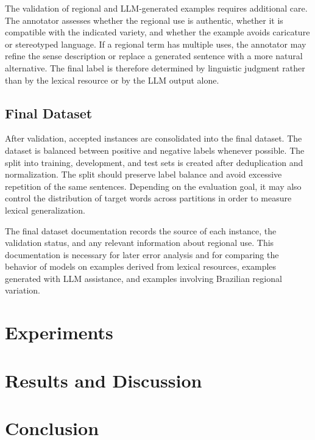 \documentclass[10pt,a4paper,twocolumn]{article}
\begin{document}
The validation of regional and LLM-generated examples requires additional care. The annotator assesses whether the regional use is authentic, whether it is compatible with the indicated variety, and whether the example avoids caricature or stereotyped language. If a regional term has multiple uses, the annotator may refine the sense description or replace a generated sentence with a more natural alternative. The final label is therefore determined by linguistic judgment rather than by the lexical resource or by the LLM output alone.

\subsection{Final Dataset}
\label{subsec:dataset-consolidation}

After validation, accepted instances are consolidated into the final dataset. The dataset is balanced between positive and negative labels whenever possible. The split into training, development, and test sets is created after deduplication and normalization. The split should preserve label balance and avoid excessive repetition of the same sentences. Depending on the evaluation goal, it may also control the distribution of target words across partitions in order to measure lexical generalization.

The final dataset documentation records the source of each instance, the validation status, and any relevant information about regional use. This documentation is necessary for later error analysis and for comparing the behavior of models on examples derived from lexical resources, examples generated with LLM assistance, and examples involving Brazilian regional variation.

\section{Experiments}

\section{Results and Discussion}

\section{Conclusion}



\end{document}
